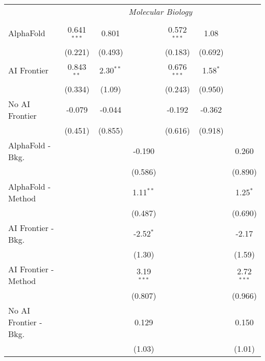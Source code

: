\begin{tabular}{lcccccc}
 & \multicolumn{6}{c}{\textit{Molecular Biology}} \\ \\
   AlphaFold               & 0.641$^{***}$ & 0.801       &               & 0.572$^{***}$ & 1.08       &   \\   
                           & (0.221)       & (0.493)     &               & (0.183)       & (0.692)    &   \\   
   AI Frontier             & 0.843$^{**}$  & 2.30$^{**}$ &               & 0.676$^{***}$ & 1.58$^{*}$ &   \\   
                           & (0.334)       & (1.09)      &               & (0.243)       & (0.950)    &   \\   
   No AI Frontier          & -0.079        & -0.044      &               & -0.192        & -0.362     &   \\   
                           & (0.451)       & (0.855)     &               & (0.616)       & (0.918)    &   \\   
   AlphaFold - Bkg.        &               &             & -0.190        &               &            & 0.260\\   
                           &               &             & (0.586)       &               &            & (0.890)\\   
   AlphaFold - Method      &               &             & 1.11$^{**}$   &               &            & 1.25$^{*}$\\   
                           &               &             & (0.487)       &               &            & (0.690)\\   
   AI Frontier - Bkg.      &               &             & -2.52$^{*}$   &               &            & -2.17\\   
                           &               &             & (1.30)        &               &            & (1.59)\\   
   AI Frontier - Method    &               &             & 3.19$^{***}$  &               &            & 2.72$^{***}$\\   
                           &               &             & (0.807)       &               &            & (0.966)\\   
   No AI Frontier - Bkg.   &               &             & 0.129         &               &            & 0.150\\   
                           &               &             & (1.03)        &               &            & (1.01)\\   

\end{tabular}
